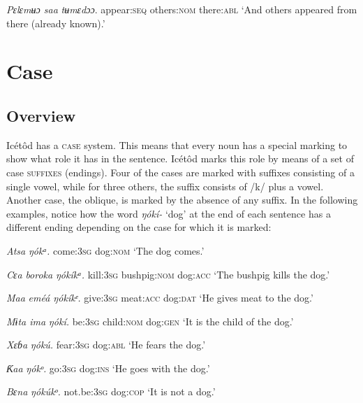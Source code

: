 \textit{Pɛlɛmʉɔ   saa}     \textit{tʉmɛdɔɔ}.
appear:\textsc{seq}   others:\textsc{nom}   there:\textsc{abl}
‘And others appeared from there (already known).’




\section{Case}



\subsection{Overview}


Icétôd has a \textsc{case} system. This means that every noun has a special marking to show what role it has in the sentence. Icétôd marks this role by means of a set of case \textsc{suffixes} (endings). Four of the cases are marked with suffixes consisting of a single vowel, while for three others, the suffix consists of /k/ plus a vowel. Another case, the oblique, is marked by the absence of any suffix. In the following examples, notice how the word \textit{ŋókí-} ‘dog’ at the end of each sentence has a different ending depending on the case for which it is marked:




\textit{Atsa}     \textit{ŋókᵃ.}
come:\textsc{3sg}   dog:\textsc{nom}
‘The dog comes.’




\textit{Cɛa}     \textit{boroka}     \textit{ŋókíkᵃ.}
kill:\textsc{3sg}   bushpig:\textsc{nom}   dog:\textsc{acc}
‘The bushpig kills the dog.’




\textit{Maa}     \textit{eméá     ŋókíkᵉ.}
give:\textsc{3sg}   meat:\textsc{acc}   dog:\textsc{dat}
‘He gives meat to the dog.’




\textit{Mɨta     ima}     \textit{ŋókí.}
be:\textsc{3sg}   child:\textsc{nom}   dog:\textsc{gen}
‘It is the child of the dog.’




\textit{Xɛɓa}     \textit{ŋókú.}
fear:\textsc{3sg}   dog:\textsc{abl}
‘He fears the dog.’




\textit{Ƙaa}     \textit{ŋókᵒ.}
go:\textsc{3sg}  dog:\textsc{ins}
‘He goes with the dog.’




\textit{Bɛna}     \textit{ŋókúkᵒ.}
not.be:\textsc{3sg}  dog:\textsc{cop}
‘It is not a dog.’




